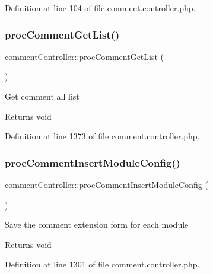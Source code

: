 Definition at line 104 of file comment.\+controller.\+php.

\hypertarget{classcommentController_ac9edb9826c8b07ceb1a4db29c5db514a}{}\label{classcommentController_ac9edb9826c8b07ceb1a4db29c5db514a} 
\subsubsection{\texorpdfstring{proc\+Comment\+Get\+List()}{procCommentGetList()}}
{\footnotesize\ttfamily comment\+Controller\+::proc\+Comment\+Get\+List (\begin{DoxyParamCaption}{ }\end{DoxyParamCaption})}

Get comment all list \begin{DoxyReturn}{Returns}
void 
\end{DoxyReturn}


Definition at line 1373 of file comment.\+controller.\+php.

\hypertarget{classcommentController_ab4a71283244210be754cceb8511e8789}{}\label{classcommentController_ab4a71283244210be754cceb8511e8789} 
\subsubsection{\texorpdfstring{proc\+Comment\+Insert\+Module\+Config()}{procCommentInsertModuleConfig()}}
{\footnotesize\ttfamily comment\+Controller\+::proc\+Comment\+Insert\+Module\+Config (\begin{DoxyParamCaption}{ }\end{DoxyParamCaption})}

Save the comment extension form for each module \begin{DoxyReturn}{Returns}
void 
\end{DoxyReturn}


Definition at line 1301 of file comment.\+controller.\+php.

\hypertarget{classcommentController_ae5c2ce138a0c36f2d7fb4f1fdcfad800}{}\label{classcommentController_ae5c2ce138a0c36f2d7fb4f1fdcfad800} 
